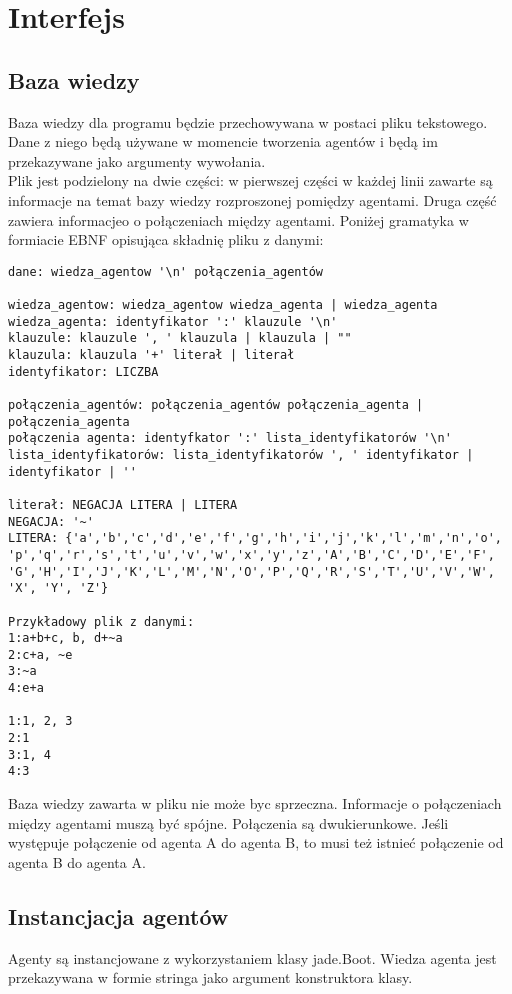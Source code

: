 \documentclass[a4paper,12pt]{mwart}
\begin{document}
\section{Interfejs}
\subsection{Baza wiedzy}
Baza wiedzy dla programu będzie przechowywana w postaci pliku tekstowego. Dane z niego będą używane w momencie tworzenia agentów i będą im przekazywane jako argumenty wywołania.
\\
Plik jest podzielony na dwie części: w pierwszej części w każdej linii zawarte są informacje na temat bazy wiedzy rozproszonej pomiędzy agentami. Druga część zawiera informacjeo o połączeniach między agentami. Poniżej gramatyka w formiacie EBNF opisująca składnię pliku z danymi:

\begin{verbatim}
dane: wiedza_agentow '\n' połączenia_agentów

wiedza_agentow: wiedza_agentow wiedza_agenta | wiedza_agenta
wiedza_agenta: identyfikator ':' klauzule '\n'
klauzule: klauzule ', ' klauzula | klauzula | ""
klauzula: klauzula '+' literał | literał
identyfikator: LICZBA

połączenia_agentów: połączenia_agentów połączenia_agenta | połączenia_agenta
połączenia agenta: identyfkator ':' lista_identyfikatorów '\n'
lista_identyfikatorów: lista_identyfikatorów ', ' identyfikator | identyfikator | ''

literał: NEGACJA LITERA | LITERA
NEGACJA: '~' 
LITERA: {'a','b','c','d','e','f','g','h','i','j','k','l','m','n','o',
'p','q','r','s','t','u','v','w','x','y','z','A','B','C','D','E','F',
'G','H','I','J','K','L','M','N','O','P','Q','R','S','T','U','V','W',
'X', 'Y', 'Z'}

Przykładowy plik z danymi:
1:a+b+c, b, d+~a
2:c+a, ~e
3:~a
4:e+a

1:1, 2, 3
2:1
3:1, 4
4:3
\end{verbatim}

Baza wiedzy zawarta w pliku nie może byc sprzeczna. Informacje o połączeniach między agentami muszą być spójne. Połączenia są dwukierunkowe. Jeśli występuje połączenie od agenta A do agenta B, to musi też istnieć połączenie od agenta B do agenta A. 

\subsection{Instancjacja agentów}
Agenty są instancjowane z wykorzystaniem klasy jade.Boot. Wiedza agenta jest przekazywana w formie stringa jako argument konstruktora klasy.
\end{document}
